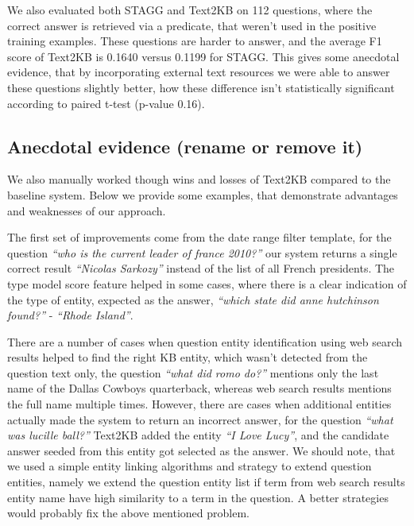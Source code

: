 We also evaluated both STAGG and Text2KB on 112 questions, where the correct answer is retrieved via a predicate, that weren't used in the positive training examples.
These questions are harder to answer, and the average F1 score of Text2KB is 0.1640 versus 0.1199 for STAGG.
This gives some anecdotal evidence, that by incorporating external text resources we were able to answer these questions slightly better, how these difference isn't statistically significant according to paired t-test (p-value 0.16).

\subsection{Anecdotal evidence (rename or remove it)}

We also manually worked though wins and losses of Text2KB compared to the baseline system.
Below we provide some examples, that demonstrate advantages and weaknesses of our approach.

The first set of improvements come from the date range filter template, \eg for the question \textit{``who is the current leader of france 2010?''} our system returns a single correct result \textit{``Nicolas Sarkozy''} instead of the list of all French presidents.
The type model score feature helped in some cases, where there is a clear indication of the type of entity, expected as the answer, \eg \textit{``which state did anne hutchinson found?''} - \textit{``Rhode Island''}.

There are a number of cases when question entity identification using web search results helped to find the right KB entity, which wasn't detected from the question text only, \eg the question \textit{``what did romo do?''} mentions only the last name of the Dallas Cowboys quarterback, whereas web search results mentions the full name multiple times.
However, there are cases when additional entities actually made the system to return an incorrect answer, \eg for the question \textit{``what was lucille ball?''} Text2KB added the entity \textit{``I Love Lucy''}, and the candidate answer seeded from this entity got selected as the answer.
We should note, that we used a simple entity linking algorithms and strategy to extend question entities, namely we extend the question entity list if term from web search results entity name have high similarity to a term in the question.
A better strategies would probably fix the above mentioned problem.

